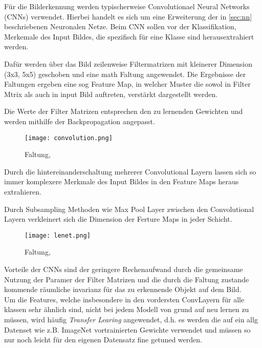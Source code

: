 Für die Bilderkennung werden typischerweise Convolutionael 
Neural Networks (CNNs) verwendet. Hierbei handelt es sich um eine Erweiterung
der in \ref{sec:nn} beschriebenen Neuronalen Netze. Beim CNN 
sollen vor der Klassifikation, Merkemale des Input Bildes,
die spezifisch für eine Klasse sind herausextrahiert werden.

Dafür werden über das Bild zeilenweise Filtermatrizen mit kleinerer Dimension
(3x3, 5x5) geschoben und eine math Faltung angewendet.
Die Ergebnisse der Faltungen ergeben eine sog Feature Map, in welcher 
Muster die sowol in Filter Mtrix als auch in input Bild auftreten, verstärkt 
dargestellt werden.

Die Werte der Filter Matrizen entsprechen den zu lernenden Gewichten 
und werden mithilfe der Backpropagation angepasst.

\begin{figure}[htb]
    \centering
    \label{fig:conv}
    \texttt{[image: convolution.png]}
    \caption{Faltung, \cite{researcherSimpleIntroductionConvolutional2019}}
\end{figure}



Durch die hintereinanderschaltung mehrerer Convolutional Layern 
lassen sich so immer komplexere Merkmale des Input Bildes in den 
Feature Maps heraus extrahieren.

Durch Subsampling Methoden wie Max Pool Layer zwischen den Convolutional
Layern verkleinert sich die Dimension der Ferture Maps in jeder Schicht.


\begin{figure}[htb]
    \centering
    \label{fig:lenet}
    \texttt{[image: lenet.png]}
    \caption{Faltung, \cite{lecunGradientBasedLearningApplied1998}}
\end{figure}


Vorteile der CNNs sind der geringere Rechenaufwand durch die gemeinsame 
Nutzung der Paramer der Filter Matrizen und die durch die 
Faltung zustande kommende räumliche invarianz für das zu erkennende 
Objekt auf dem Bild.
\\
Um die Features, welche insbesondere in den vordersten ConvLayern für 
alle klassen sehr ähnlich sind, nicht bei jedem Modell von grund auf 
neu lernen zu müssen, wird häufig \textit{Transfer Learing} angewendet, 
d.h. es werden die auf ein allg Datenset wie z.B. ImageNet vortrainierten
Gewichte verwendet und müssen so nur noch leicht für den eigenen Datensatz 
fine getuned werden.


